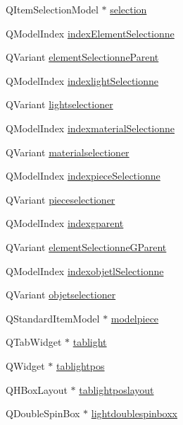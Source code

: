 \begin{DoxyCompactItemize}
\item 
Q\+Item\+Selection\+Model $\ast$ \hyperlink{class_mondock_aa0a94c4bfce0d7d4f2547da10d365275}{selection}
\item 
Q\+Model\+Index \hyperlink{class_mondock_a48e5355dbb076ca71a13e42172f342ca}{index\+Element\+Selectionne}
\item 
Q\+Variant \hyperlink{class_mondock_a5a0f5cf7817eee757956874e3bec2043}{element\+Selectionne\+Parent}
\item 
Q\+Model\+Index \hyperlink{class_mondock_ac8fa555c082f94d22d369eed852f93c3}{indexlight\+Selectionne}
\item 
Q\+Variant \hyperlink{class_mondock_a35acbdbc03ccc8bd255083f8499188f5}{lightselectioner}
\item 
Q\+Model\+Index \hyperlink{class_mondock_a8816860ad6351028d8d4e5b022b2b266}{indexmaterial\+Selectionne}
\item 
Q\+Variant \hyperlink{class_mondock_a09fab02186d86e999d23b4f9c667353f}{materialselectioner}
\item 
Q\+Model\+Index \hyperlink{class_mondock_ab950bd39d928049d2788f4690ba45755}{indexpiece\+Selectionne}
\item 
Q\+Variant \hyperlink{class_mondock_acc6d9454fd6ff20be6309e30aa5053c3}{pieceselectioner}
\item 
Q\+Model\+Index \hyperlink{class_mondock_a54452b93781c23fe0e40d764b2d278fe}{indexgparent}
\item 
Q\+Variant \hyperlink{class_mondock_a3c00ae3b69dc59785835aa2d04b73392}{element\+Selectionne\+G\+Parent}
\item 
Q\+Model\+Index \hyperlink{class_mondock_ab7756e9a6862132ca6b86d4b94c834c0}{indexobjetl\+Selectionne}
\item 
Q\+Variant \hyperlink{class_mondock_aba0697efe8eb1eff576ce6599aea10f3}{objetselectioner}
\item 
Q\+Standard\+Item\+Model $\ast$ \hyperlink{class_mondock_a2560c460ea144a4e8b2300dadf8df8ed}{modelpiece}
\item 
Q\+Tab\+Widget $\ast$ \hyperlink{class_mondock_aff9f46d61c662d10837346c496160ed1}{tablight}
\item 
Q\+Widget $\ast$ \hyperlink{class_mondock_af55525ced19bade9444f69f28ceb63bb}{tablightpos}
\item 
Q\+H\+Box\+Layout $\ast$ \hyperlink{class_mondock_aa1e272ef1c0db51aac8861812e367b27}{tablightposlayout}
\item 
Q\+Double\+Spin\+Box $\ast$ \hyperlink{class_mondock_a16569a61106b1c9d6506d1d2a2600759}{lightdoublespinboxx}

\end{DoxyCompactItemize}
